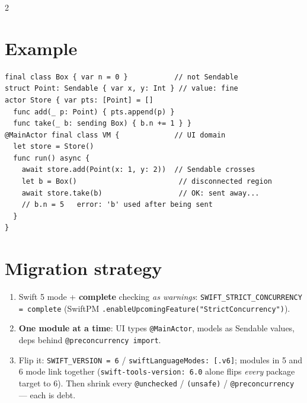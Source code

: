 \documentclass[8pt]{extarticle}
\begin{document}
\begin{multicols}{2}
\section{Example}
\begin{lstlisting}[language=SwiftSheet]
final class Box { var n = 0 }           // not Sendable
struct Point: Sendable { var x, y: Int } // value: fine
actor Store { var pts: [Point] = []
  func add(_ p: Point) { pts.append(p) }
  func take(_ b: sending Box) { b.n += 1 } }
@MainActor final class VM {             // UI domain
  let store = Store()
  func run() async {
    await store.add(Point(x: 1, y: 2))  // Sendable crosses
    let b = Box()                        // disconnected region
    await store.take(b)                  // OK: sent away...
    // b.n = 5   error: 'b' used after being sent
  }
}
\end{lstlisting}

\section{Migration strategy}
\begin{enumerate}
  \item Swift 5 mode + \textbf{complete} checking \emph{as warnings}:
        \texttt{SWIFT\_STRICT\_CONCURRENCY = complete} (SwiftPM
        \texttt{.enableUpcomingFeature("StrictConcurrency")}).
  \item \textbf{One module at a time}: UI types \texttt{@MainActor}, models as
        Sendable values, deps behind \texttt{@preconcurrency import}.
  \item Flip it: \texttt{SWIFT\_VERSION = 6} / \texttt{swiftLanguageModes: [.v6]};
        modules in 5 and 6 mode link together (\texttt{swift-tools-version: 6.0} alone flips \emph{every} package target to 6). Then shrink every
        \texttt{@unchecked} / \texttt{(unsafe)} / \texttt{@preconcurrency} —
        each is debt.
\end{enumerate}

\columnbreak


\end{multicols}
\end{document}

